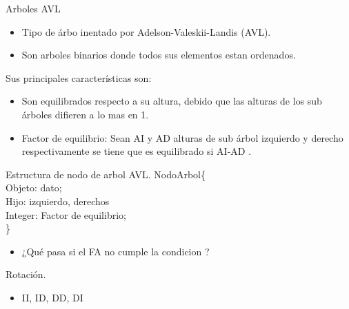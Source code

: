 \documentclass[handout]{beamer} %
\begin{document}
\begin{frame}{Arboles AVL}
  \begin{itemize}
\item Tipo de árbo inentado por Adelson-Valeskii-Landis (AVL).
\item Son arboles binarios donde todos sus elementos estan ordenados.
\end{itemize}
Sus principales características son:
\begin{itemize}
  \item Son equilibrados respecto a su altura, debido que las alturas de los sub árboles difieren a lo mas en 1.
  \item Factor de equilibrio: Sean AI y AD alturas de sub árbol izquierdo y derecho respectivamente se tiene que es equilibrado si {\mid AI-AD \mid {}}.
\end{itemize}
\end{frame}

\begin{frame}{Estructura de nodo de arbol AVL. }
  NodoArbol\{ \\
    \quad \quad Objeto: dato;\\
    \quad \quad Hijo: izquierdo, derechos\\
    \quad \quad Integer: Factor de equilibrio;\\
  \}\\
  \begin{itemize}
    \item ¿Qué pasa si el FA no cumple la condicion 	 ?
  \end{itemize}
\end{frame}

\begin{frame}{Rotación. }
\begin{itemize}
  \item II, ID, DD, DI
\end{itemize}
\end{frame}
\end{document}
